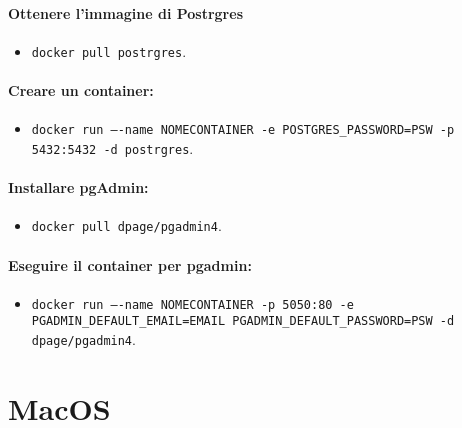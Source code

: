 \paragraph{Ottenere l'immagine di Postrgres}

\begin{itemize}
  \item \texttt{docker pull postrgres}.
\end{itemize}

\paragraph{Creare un container:}

\begin{itemize}
  \item \texttt{docker run ----name NOMECONTAINER -e POSTGRES\_PASSWORD=PSW -p 5432:5432 -d postrgres}. 
\end{itemize}


\paragraph{Installare pgAdmin:}

\begin{itemize}
  \item \texttt{docker pull dpage/pgadmin4}.
\end{itemize}

\paragraph{Eseguire il container per pgadmin:}

\begin{itemize}
  \item \texttt{docker run ----name NOMECONTAINER -p 5050:80 -e PGADMIN\_DEFAULT\_EMAIL=EMAIL PGADMIN\_DEFAULT\_PASSWORD=PSW -d dpage/pgadmin4}. 
\end{itemize}


\section{MacOS}

